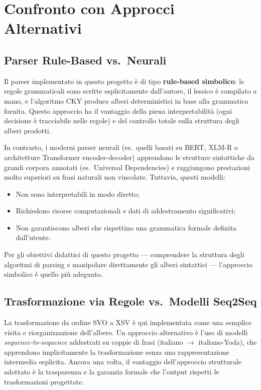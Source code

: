 \documentclass[12pt, a4paper]{article}
\begin{document}
\section{Confronto con Approcci Alternativi}

\subsection{Parser Rule-Based vs.\ Neurali}

Il parser implementato in questo progetto è di tipo \textbf{rule-based simbolico}:
le regole grammaticali sono scritte esplicitamente dall'autore, il lessico è
compilato a mano, e l'algoritmo CKY produce alberi deterministici in base alla
grammatica fornita. Questo approccio ha il vantaggio della piena interpretabilità
(ogni decisione è tracciabile nelle regole) e del controllo totale sulla struttura
degli alberi prodotti.

In contrasto, i moderni parser neurali (es.\ quelli basati su BERT, XLM-R o
architetture Transformer encoder-decoder) apprendono le strutture sintattiche
da grandi corpora annotati (es.\ Universal Dependencies) e raggiungono prestazioni
molto superiori su frasi naturali non vincolate. Tuttavia, questi modelli:
\begin{itemize}
    \item Non sono interpretabili in modo diretto;
    \item Richiedono risorse computazionali e dati di addestramento significativi;
    \item Non garantiscono alberi che rispettino una grammatica formale definita
          dall'utente.
\end{itemize}

Per gli obiettivi didattici di questo progetto — comprendere la struttura degli
algoritmi di parsing e manipolare direttamente gli alberi sintattici — l'approccio
simbolico è quello più adeguato.

\subsection{Trasformazione via Regole vs.\ Modelli Seq2Seq}

La trasformazione da ordine SVO a XSV è qui implementata come una semplice
visita e riorganizzazione dell'albero. Un approccio alternativo è l'uso di modelli
\textit{sequence-to-sequence} addestrati su coppie di frasi (italiano $\rightarrow$
italiano-Yoda), che apprendono implicitamente la trasformazione senza una
rappresentazione intermedia esplicita. Ancora una volta, il vantaggio dell'approccio
strutturale adottato è la trasparenza e la garanzia formale che l'output rispetti
le trasformazioni progettate.
\end{document}
